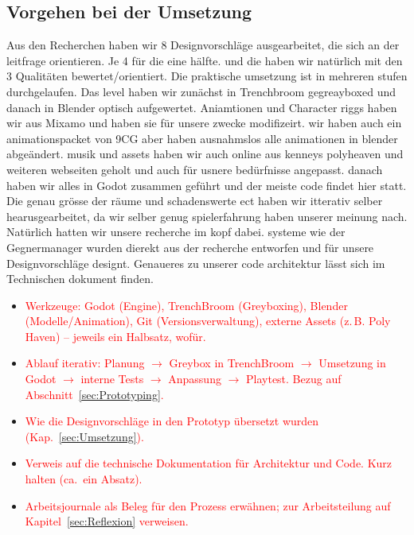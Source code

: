 \documentclass[../Main.tex]{subfiles}
\begin{document}
\subsection{Vorgehen bei der Umsetzung} \label{sec:VorgehenUmsetzung}
Aus den Recherchen haben wir 8 Designvorschläge ausgearbeitet, die sich an der leitfrage orientieren. Je 4 für die eine hälfte. und die haben wir natürlich mit den 3 Qualitäten bewertet/orientiert.
Die praktische umsetzung ist in mehreren stufen durchgelaufen. Das level haben wir zunächst in Trenchbroom gegreayboxed und danach in Blender optisch aufgewertet. Aniamtionen und Character riggs haben wir aus Mixamo und haben sie für unsere zwecke modifizeirt. wir haben auch ein animationspacket von 9CG aber haben ausnahmslos alle animationen in blender abgeändert. musik und assets haben wir auch online aus kenneys polyheaven und weiteren webseiten geholt und auch für usnere bedürfnisse angepasst. danach haben wir alles in Godot zusammen geführt und der meiste code findet hier statt. Die genau grösse der räume und schadenswerte ect haben wir itterativ selber hearusgearbeitet, da wir selber genug spielerfahrung haben unserer meinung nach. Natürlich hatten wir unsere recherche im kopf dabei. systeme wie der Gegnermanager wurden dierekt aus der recherche entworfen und für unsere Designvorschläge designt. Genaueres zu unserer code architektur lässt sich im Technischen dokument finden.
\begin{itemize}[leftmargin=1.5cm]
    \item \textcolor{red}{Werkzeuge: Godot (Engine), TrenchBroom (Greyboxing), Blender (Modelle/Animation), Git (Versionsverwaltung), externe Assets (z.\,B. Poly Haven) -- jeweils ein Halbsatz, wofür.}
    \item \textcolor{red}{Ablauf iterativ: Planung $\rightarrow$ Greybox in TrenchBroom $\rightarrow$ Umsetzung in Godot $\rightarrow$ interne Tests $\rightarrow$ Anpassung $\rightarrow$ Playtest. Bezug auf Abschnitt~\ref{sec:Prototyping}.}
    \item \textcolor{red}{Wie die Designvorschläge in den Prototyp übersetzt wurden (Kap.~\ref{sec:Umsetzung}).}
    \item \textcolor{red}{Verweis auf die technische Dokumentation für Architektur und Code. Kurz halten (ca.\ ein Absatz).}
    \item \textcolor{red}{Arbeitsjournale als Beleg für den Prozess erwähnen; zur Arbeitsteilung auf Kapitel~\ref{sec:Reflexion} verweisen.}
\end{itemize}
\end{document}
